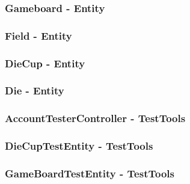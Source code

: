 \documentclass{article}
\begin{document}
\subsubsection{Gameboard - Entity}

\subsubsection{Field - Entity}

\subsubsection{DieCup - Entity}

\subsubsection{Die - Entity}

\subsubsection{AccountTesterController - TestTools}

\subsubsection{DieCupTestEntity - TestTools}

\subsubsection{GameBoardTestEntity - TestTools}

\end{document}
